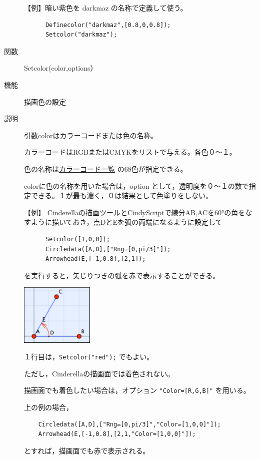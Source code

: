 \documentclass[papersize,a4paper,12pt,uplatex]{jsarticle}
\begin{document}
\begin{description}
\vspace{\baselineskip}
  【例】暗い紫色を darkmaz の名称で定義して使う。
\begin{verbatim}
      Definecolor("darkmaz",[0.8,0,0.8]);
      Setcolor("darkmaz");
\end{verbatim}


\vspace{\baselineskip}
\hypertarget{setcolor}{}
\item[関数]  Setcolor(color,options）
\item[機能]  描画色の設定
\item[説明]  引数colorはカラーコードまたは色の名称。

カラーコードはRGBまたはCMYKをリストで与える。各色０〜１。
  
色の名称は\hyperlink{colorcodelist}{カラーコード一覧} の68色が指定できる。

colorに色の名称を用いた場合は，option として，透明度を０〜１の数で指定できる。１が最も濃く，０は結果として色塗りをしない。


\vspace{\baselineskip}
【例】  Cinderellaの描画ツールとCindyScriptで線分AB,ACを60°の角をなすように描いておき，点DとEを弧の両端になるように設定して
\begin{verbatim}
      Setcolor([1,0,0]);
      Circledata([A,D],["Rng=[0,pi/3]"]);
      Arrowhead(E,[-1,0.8],[2,1]);
\end{verbatim}
を実行すると，矢じりつきの弧を赤で表示することができる。

\vspace{\baselineskip}
\hspace{20mm} \includegraphics[width=3.5cm,bb=0 0 161 134]{Fig/setcolor.pdf} 
  
１行目は，\verb|Setcolor("red");|  でもよい。

ただし，Cinderellaの描画面では着色されない。

描画面でも着色したい場合は，オプション \verb|"Color=[R,G,B]"| を用いる。

上の例の場合，
\begin{verbatim}
    Circledata([A,D],["Rng=[0,pi/3]","Color=[1,0,0]"]);
    Arrowhead(E,[-1,0.8],[2,1,"Color=[1,0,0]"]);
\end{verbatim}
とすれば，描画面でも赤で表示される。


\end{description}
\end{document}

